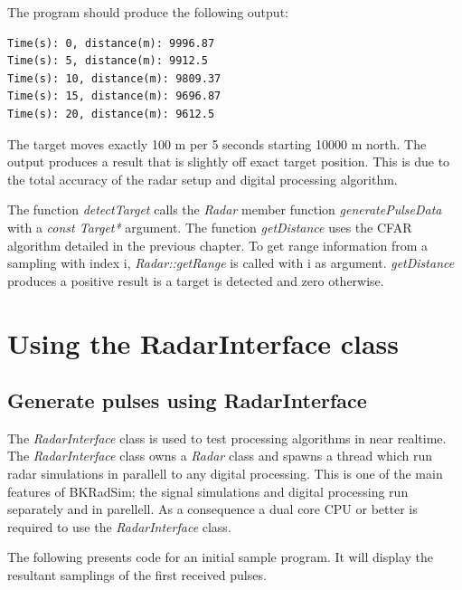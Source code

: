 \documentclass[letterpaper]{book}
\begin{document}
The program should produce the following output:
\begin{lstlisting}
Time(s): 0, distance(m): 9996.87
Time(s): 5, distance(m): 9912.5
Time(s): 10, distance(m): 9809.37
Time(s): 15, distance(m): 9696.87
Time(s): 20, distance(m): 9612.5
\end{lstlisting}
The target moves exactly 100 m per 5 seconds starting 10000 m north. The output produces a result that is slightly off exact target position. This is due to the total accuracy of the radar setup and digital processing algorithm. 

The function \textit{detectTarget} calls the \textit{Radar} member function \textit{generatePulseData} with a \textit{const Target*} argument. The function \textit{getDistance} uses the CFAR algorithm detailed in the previous chapter. To get range information from a sampling with index i, \textit{Radar::getRange} is called with i as argument. \textit{getDistance} produces a positive result is a target is detected and zero otherwise. 

\section{Using the RadarInterface class}
\subsection{Generate pulses using RadarInterface}
The \textit{RadarInterface} class is used to test processing algorithms in near realtime. The \textit{RadarInterface} class owns a \textit{Radar} class and spawns a thread which run radar simulations in parallell to any digital processing. This is one of the main features of BKRadSim; the signal simulations and digital processing run separately and in parellell. As a consequence a dual core CPU or better is required to use the \textit{RadarInterface} class. 

The following presents code for an initial sample program. It will display the resultant samplings of the first received pulses.

\end{document}
